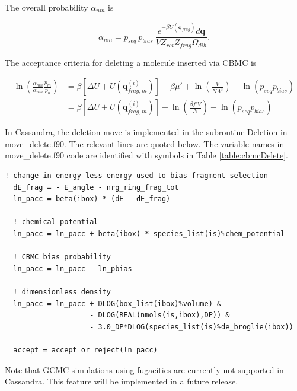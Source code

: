 The overall probability $\alpha_{nm}$ is 

\begin{equation}
\label{eq:alpha_cbmcReverseDelete}
\alpha_{nm} = p_{seq}\ p_{bias}\ \frac{e^{-\beta U(\mathbf{q}_{frag})}d\mathbf{q}}{VZ_{rot}Z_{frag}\Omega_{dih}}.
\end{equation}

The acceptance criteria for deleting a molecule inserted via CBMC is

\begin{align}
\label{eq:pAcc_cbmcDeleteMuShift}
\ln\left( \frac{\alpha_{mn}}{\alpha_{nm}} \frac{p_m}{p_n} \right) &= \beta \left[\Delta U + U(\mathbf{q}^{(i)}_{frag,m})\right] + \beta \mu' + \ln\left( \frac{V}{N\Lambda^3} \right) - \ln\left( p_{seq}p_{bias} \right) \\
\label{eq_pAcc_cbmcDeleteF}
&= \beta \left[\Delta U + U(\mathbf{q}^{(i)}_{frag,m})\right] + \ln\left( \frac{\beta f' V}{N} \right) - \ln\left( p_{seq}p_{bias} \right)
\end{align}

In Cassandra, the deletion move is implemented in the subroutine Deletion in move\_delete.f90. The relevant lines are quoted below. The variable names in move\_delete.f90 code are identified with symbols in Table \ref{table:cbmcDelete}.

\begin{minipage}{\linewidth}
\begin{lstlisting}[firstnumber=317, caption=move\_delete.f90]
  ! change in energy less energy used to bias fragment selection
  dE_frag = - E_angle - nrg_ring_frag_tot
  ln_pacc = beta(ibox) * (dE - dE_frag)

  ! chemical potential
  ln_pacc = ln_pacc + beta(ibox) * species_list(is)%chem_potential

  ! CBMC bias probability
  ln_pacc = ln_pacc - ln_pbias

  ! dimensionless density
  ln_pacc = ln_pacc + DLOG(box_list(ibox)%volume) &
                    - DLOG(REAL(nmols(is,ibox),DP)) &
                    - 3.0_DP*DLOG(species_list(is)%de_broglie(ibox))

  accept = accept_or_reject(ln_pacc)
\end{lstlisting}
\end{minipage}

Note that GCMC simulations using fugacities are currently not supported in Cassandra. This feature
will be implemented in a future release.

